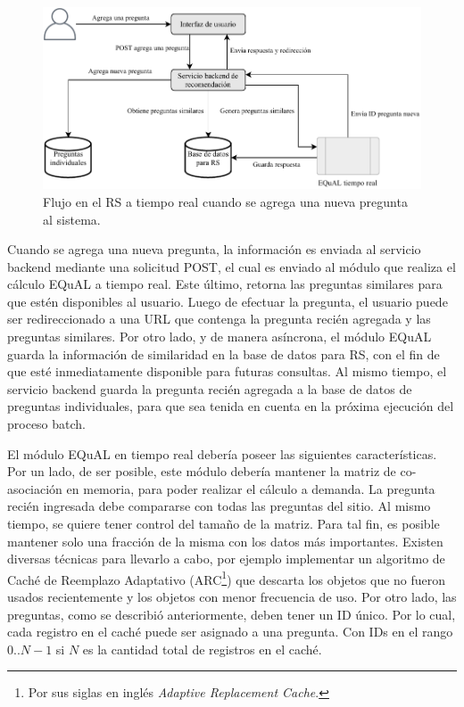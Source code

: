 \begin{figure}[h!]
	\centering
	\includegraphics[width=0.9\linewidth]{8_problema_investigacion/imagenes/implementacion_rs_agregar}
	\caption{Flujo en el RS a tiempo real cuando se agrega una nueva pregunta al sistema.}
	\label{fig:implementacionrsagregar}
\end{figure}

\bigskip Cuando se agrega una nueva pregunta, la información es enviada al servicio backend mediante una solicitud POST, el cual es enviado al módulo que realiza el cálculo EQuAL a tiempo real. Este último, retorna las preguntas similares para que estén disponibles al usuario. Luego de efectuar la pregunta, el usuario puede ser redireccionado a una URL que contenga la pregunta recién agregada y las preguntas similares. Por otro lado, y de manera asíncrona, el módulo EQuAL guarda la información de similaridad en la base de datos para RS, con el fin de que esté inmediatamente disponible para futuras consultas. Al mismo tiempo, el servicio backend guarda la pregunta recién agregada a la base de datos de preguntas individuales, para que sea tenida en cuenta en la próxima ejecución del proceso batch.

\bigskip El módulo EQuAL en tiempo real debería poseer las siguientes características. Por un lado, de ser posible, este módulo debería mantener la matriz de co-asociación en memoria, para poder realizar el cálculo a demanda. La pregunta recién ingresada debe compararse con todas las preguntas del sitio. Al mismo tiempo, se quiere tener control del tamaño de la matriz. Para tal fin, es posible mantener solo una fracción de la misma con los datos más importantes. Existen diversas técnicas para llevarlo a cabo, por ejemplo implementar un algoritmo de Caché de Reemplazo Adaptativo (ARC\footnote{Por sus siglas en inglés \textit{Adaptive Replacement Cache}.}) que descarta los objetos que no fueron usados recientemente y los objetos con menor frecuencia de uso.  Por otro lado, las preguntas, como se describió anteriormente, deben tener un ID único. Por lo cual, cada registro en el caché puede ser asignado a una pregunta. Con IDs en el rango \(0.. N-1\) si \(N\) es la cantidad total de registros en el caché.

